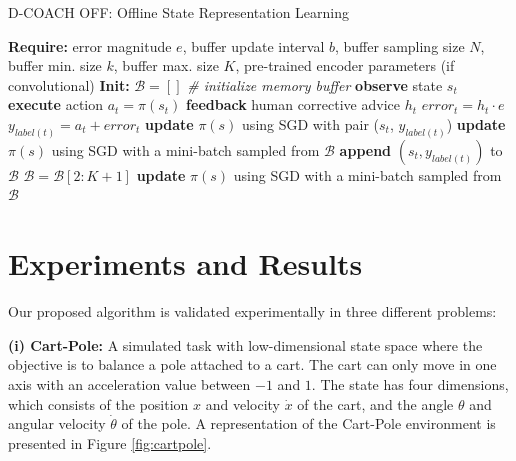 \begin{algorithm}[h]
\caption{D-COACH OFF: Offline State Representation Learning}\label{algorithm:DeepCOACH}
\begin{algorithmic}[1]
\State \textbf{Require:} error magnitude $e$, buffer update interval $b$, buffer sampling size $N$, buffer min. size $k$, buffer max. size $K$, pre-trained encoder parameters (if convolutional) 
\State \textbf{Init:} $\mathcal{B} = []$  \emph{\# initialize memory buffer}
\State \textbf{observe} state $s_{t}$
\State \textbf{execute} action $a_{t}=\pi(s_{t})$
\State \textbf{feedback} human corrective advice $h_{t}$
\State $\mathit{error}_{t} = h_{t}\cdot e$
\State $y_{label(t)} = a_{t} + \mathit{error}_{t}$ 
\State \textbf{update} $\pi(s)$ using SGD with pair ($s_{t}$, $y_{\mathit{label}(t)}$) 
\State \textbf{update} $\pi(s)$ using SGD with a mini-batch sampled from $\mathcal{B}$
\State \textbf{append} $(s_{t}, y_{\mathit{label}(t)})$ to $\mathcal{B}$
\State $\mathcal{B} = \mathcal{B}[2:K+1]$
\EndIf
\EndIf
{}
\State \textbf{update} $\pi(s)$ using SGD with a mini-batch sampled from $\mathcal{B}$
\EndIf
\EndFor
\end{algorithmic}
\end{algorithm}

\section{Experiments and Results}

Our proposed algorithm is validated experimentally in three different problems: 

\textbf{(i) Cart-Pole:} A simulated task with low-dimensional state space where the objective is to balance a pole attached to a cart. The cart can only move in one axis with an acceleration value between $-1$ and $1$. The state has four dimensions, which consists of the position $x$ and velocity $\dot x$ of the cart, and the angle $\theta$ and angular velocity $\dot \theta$ of the pole. A representation of the Cart-Pole environment is presented in Figure \ref{fig:cartpole}.

